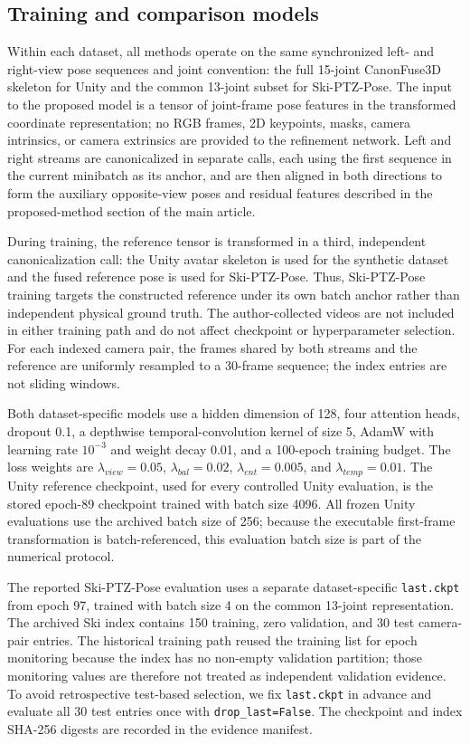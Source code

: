 \documentclass[11pt,letterpaper]{article}
\begin{document}
\subsection{Training and comparison models}


Within each dataset, all methods operate on the same synchronized left- and right-view pose sequences and joint convention: the full 15-joint CanonFuse3D skeleton for Unity and the common 13-joint subset for Ski-PTZ-Pose. The input to the proposed model is a tensor of joint-frame pose features in the transformed coordinate representation; no RGB frames, 2D keypoints, masks, camera intrinsics, or camera extrinsics are provided to the refinement network. Left and right streams are canonicalized in separate calls, each using the first sequence in the current minibatch as its anchor, and are then aligned in both directions to form the auxiliary opposite-view poses and residual features described in the proposed-method section of the main article.

During training, the reference tensor is transformed in a third, independent canonicalization call: the Unity avatar skeleton is used for the synthetic dataset and the fused reference pose is used for Ski-PTZ-Pose. Thus, Ski-PTZ-Pose training targets the constructed reference under its own batch anchor rather than independent physical ground truth. The author-collected videos are not included in either training path and do not affect checkpoint or hyperparameter selection. For each indexed camera pair, the frames shared by both streams and the reference are uniformly resampled to a 30-frame sequence; the index entries are not sliding windows.

Both dataset-specific models use a hidden dimension of 128, four attention heads, dropout 0.1, a depthwise temporal-convolution kernel of size 5, AdamW with learning rate \(10^{-3}\) and weight decay 0.01, and a 100-epoch training budget. The loss weights are \(\lambda_{view}=0.05\), \(\lambda_{bal}=0.02\), \(\lambda_{ent}=0.005\), and \(\lambda_{temp}=0.01\). The Unity reference checkpoint, used for every controlled Unity evaluation, is the stored epoch-89 checkpoint trained with batch size 4096. All frozen Unity evaluations use the archived batch size of 256; because the executable first-frame transformation is batch-referenced, this evaluation batch size is part of the numerical protocol.

The reported Ski-PTZ-Pose evaluation uses a separate dataset-specific \texttt{last.ckpt} from epoch 97, trained with batch size 4 on the common 13-joint representation. The archived Ski index contains 150 training, zero validation, and 30 test camera-pair entries. The historical training path reused the training list for epoch monitoring because the index has no non-empty validation partition; those monitoring values are therefore not treated as independent validation evidence. To avoid retrospective test-based selection, we fix \texttt{last.ckpt} in advance and evaluate all 30 test entries once with \texttt{drop\_last=False}. The checkpoint and index SHA-256 digests are recorded in the evidence manifest.
\end{document}

